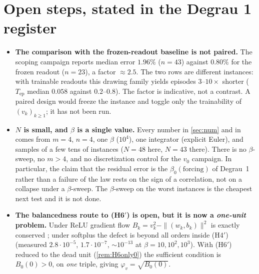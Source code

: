 \documentclass[11pt]{article}
\theoremstyle{remark}
\newcommand{\Tep}{T_{\mathrm{ep}}}
\newcommand{\hyplabel}[1]{\textup{(#1)}}
\begin{document}
\section{Open steps, stated in the Degrau 1 register}\label{sec:open}

\begin{itemize}
\item[(P1)] \textbf{The comparison with the frozen-readout baseline is not
paired.} The scoping campaign reports median error $1.96\%$ ($n=43$) against
$0.80\%$ for the frozen readout ($n=23$), a factor $\approx2.5$. The two rows
are different instances: with trainable readouts this drawing family yields
episodes $3$--$10\times$ shorter ($\Tep$ median $0.058$ against $0.2$--$0.8$).
The factor is indicative, not a contrast. A paired design would freeze the
instance and toggle only the trainability of $(v_k)_{k\ge1}$; it has not been
run.
\item[(P2)] \textbf{$N$ is small, and $\beta$ is a single value.} Every number
in \cref{sec:num} and in \cite{scoping} comes from $m=4$, $n=4$, one $\beta$
($10^4$), one integrator (explicit Euler), and samples of a few tens of
instances ($N=48$ here, $N=43$ there). There is no $\beta$-sweep, no $m>4$, and no discretization control
for the $v_0$ campaign. In particular, the claim that the residual error is the
$\beta_0(\text{forcing})$ of Degrau~1 rather than a failure of the law rests on
the sign of a correlation, not on a collapse under a $\beta$-sweep. The
$\beta$-sweep on the worst instances is the cheapest next test and it is not
done.
\item[(P3)] \textbf{The balancedness route to \hyplabel{H6$'$} is open, but it
is now a \emph{one-unit} problem.} Under ReLU gradient flow
$B_k=v_k^2-\|(w_k,b_k)\|^2$ is exactly conserved \cite{duhulee}; under softplus
the defect is beyond all orders inside \hyplabel{H4$'$} (measured
$2.8\cdot10^{-5}$, $1.7\cdot10^{-7}$, $\sim10^{-13}$ at
$\beta=10,10^2,10^3$). With \hyplabel{H6$'$} reduced to the dead unit
(\cref{rem:H6only0}) the sufficient condition is $B_0(0)>0$, on \emph{one}
triple, giving $\varphi_v=\sqrt{B_0(0)}$.


\end{itemize}
\end{document}

